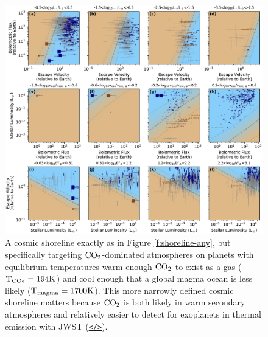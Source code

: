 \documentclass[modern,linenumbers,trackchanges]{aastex7}
\begin{document}
\begin{figure}[ht!]
\includegraphics[width=\textwidth]{figures/grid-of-shorelines-CO2.pdf}
\caption{A cosmic shoreline exactly as in Figure \ref{f:shoreline-any}, but specifically targeting $\rm{CO}_2$-dominated atmospheres on planets with equilibrium temperatures warm enough $\rm{CO_2}$ to exist as a gas (${\rm T_{CO_2}}= 194 \mathrm{K}$) and cool enough that a global magma ocean is less likely (${\rm T_{magma}} = 1700 \mathrm{K}$). This more narrowly defined cosmic shoreline matters because $\rm CO_2$ is both likely in warm secondary atmospheres and relatively easier to detect for exoplanets in thermal emission with JWST (\href{https://github.com/zkbt/shoreline/blob/main/notebooks/plot-shorelines.ipynb}{\texttt{</>}}).}
\label{f:shoreline-CO2}
\end{figure}
\end{document}
